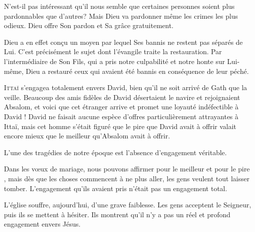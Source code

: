 N'est-il pas intéressant qu'il nous semble que certaines personnes
 soient plus pardonnables que d'autres?
 Mais Dieu va pardonner même les crimes les plus odieux.
 Dieu offre Son pardon et Sa grâce gratuitement. 


Dieu a en effet conçu un moyen par lequel \og Ses bannis \fg{}
 ne restent pas séparés de Lui.
 C'est précisément le sujet dont l'évangile traite \ocadr la restauration.
 Par l'intermédiaire de Son Fils, qui a pris notre culpabilité et notre honte
 sur Lui-même, Dieu a restauré ceux qui avaient été bannis en conséquence
 de leur péché. 

\dvrule






\lettrine{I}{ttaï} s'engagea totalement envers David,
 bien qu'il ne soit arrivé de Gath que la veille.
 Beaucoup des amis fidèles de David désertaient le navire
 et rejoignaient Absalom, et voici que cet étranger arrive
 et promet une loyauté indéfectible à David !
 David ne faisait aucune espèce d'offres particulièrement attrayantes
 à Ittaï, mais cet homme s'était figuré que le pire que David avait
 à offrir valait encore mieux que le meilleur qu'Absalom avait à offrir.

L'une des tragédies de notre époque est l'absence d'engagement véritable. 


Dans les v\oe{}ux de mariage, nous pouvons affirmer
 \og pour le meilleur et pour le pire \fg{}, mais dès que les choses
 commencent à ne plus aller, les gens veulent tout laisser tomber.
 L'engagement qu'ils avaient pris n'était pas un engagement total. 

L'église 
 souffre, aujourd'hui, d'une grave faiblesse.
 Les gens acceptent le Seigneur, puis ils se mettent à hésiter.
 Ils montrent qu'il n'y a pas un réel et profond engagement envers Jésus.

